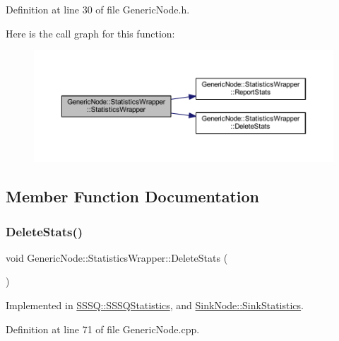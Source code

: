Definition at line 30 of file Generic\+Node.\+h.

Here is the call graph for this function\+:\nopagebreak
\begin{figure}[H]
\begin{center}
\leavevmode
\includegraphics[width=350pt]{class_generic_node_1_1_statistics_wrapper_a622a879b73b1607826c3bd5879366382_cgraph}
\end{center}
\end{figure}


\subsection{Member Function Documentation}
\mbox{\label{class_generic_node_1_1_statistics_wrapper_a08f3642bccd77ccf4d7a8b7010559e1c}} 
\subsubsection{\texorpdfstring{Delete\+Stats()}{DeleteStats()}}
{\footnotesize\ttfamily void Generic\+Node\+::\+Statistics\+Wrapper\+::\+Delete\+Stats (\begin{DoxyParamCaption}{ }\end{DoxyParamCaption})\hspace{0.3cm}{\ttfamily [pure virtual]}}



Implemented in \hyperlink{class_s_s_s_q_1_1_s_s_s_q_statistics_a8cddfec8ce3d2f4b31c15f3d07822b05}{S\+S\+S\+Q\+::\+S\+S\+S\+Q\+Statistics}, and \hyperlink{class_sink_node_1_1_sink_statistics_a9bd64cbc1cbe5f75ae5bd4971a3453b0}{Sink\+Node\+::\+Sink\+Statistics}.



Definition at line 71 of file Generic\+Node.\+cpp.

